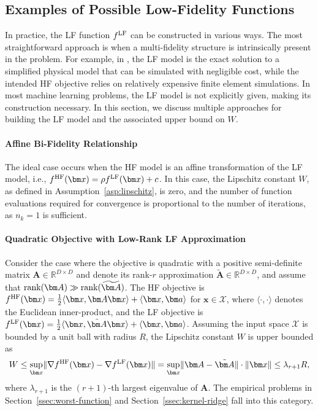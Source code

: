 \documentclass[10pt]{article} %
\numberwithin{equation}{section}
\theoremstyle{plain}
\theoremstyle{definition}
\newcommand{\<}{\langle}
\renewcommand{\>}{\rangle}
\renewcommand{\(}{\left(}
\renewcommand{\)}{\right)}
\renewcommand{\[}{\left[}
\renewcommand{\]}{\right]}
\def\R{{\mathbb R}}
\def\R{{\mathbb R}}
\newcommand{\HF}{\textup{HF}}
\newcommand{\LF}{\textup{LF}}
\begin{document}
\subsection{Examples of Possible Low-Fidelity Functions}
\label{ssec:examples}

\noindent In practice, the LF function $f^\LF$ can be constructed in various ways. The most straightforward approach is when a multi-fidelity structure is intrinsically present in the problem. For example, in \citet[Section 5.1]{cheng2024bi}, the LF model is the exact solution to a simplified physical model that can be simulated with negligible cost, while the intended HF objective relies on relatively expensive finite element simulations. In most machine learning problems, the LF model is not explicitly given, making its construction necessary. In this section, we discuss multiple approaches for building the LF model and the associated upper bound on $W$.

\paragraph{Affine Bi-Fidelity Relationship}
The ideal case occurs when the HF model is an affine transformation of the LF model, i.e., $f^\HF(\bm x) = \rho f^\LF(\bm x) + c$. In this case, the Lipschitz constant $W$, as defined in Assumption~\ref{asp:lipschitz}, is zero, and the number of function evaluations required for convergence is proportional to the number of iterations, as $n_k=1$ is sufficient.

\paragraph{Quadratic Objective with Low-Rank LF Approximation}
Consider the case where the objective is quadratic with a positive semi-definite matrix $\bm A \in \R^{D \times D}$ and denote its rank-$r$ approximation $\widetilde{\bm A} \in \R^{D \times D}$, and assume that $\textup{rank}(\bm A) \gg \textup{rank}(\widetilde{\bm A})$. The HF objective is $f^\HF(\bm x) = \frac{1}{2} \langle \bm x, \bm A \bm x \rangle + \langle \bm x, \bm a \rangle$ for $\bm x \in\mathcal{X}$, where $\langle \cdot, \cdot \rangle$ denotes the Euclidean inner-product, and the LF objective is $f^\LF(\bm x) = \frac{1}{2} \langle \bm x, \tilde{\bm A} \bm x \rangle + \langle \bm x, \bm a \rangle$. Assuming the input space $\mathcal{X}$ is bounded by a unit ball with radius $R$, the Lipschitz constant $W$ is upper bounded as
\begin{equation}
    W \leq \sup_{\bm x} \lVert \nabla f^\HF(\bm x) - \nabla f^\LF(\bm x) \rVert = \sup_{\bm x} \lVert \bm A - \tilde{\bm A} \rVert \cdot \lVert \bm x \rVert \leq \lambda_{r+1} R,
\end{equation}
where $\lambda_{r+1}$ is the $(r+1)$-th largest eigenvalue of $\bm A$. The empirical problems in Section~\ref{ssec:worst-function} and Section~\ref{ssec:kernel-ridge} fall into this category.
\end{document}
